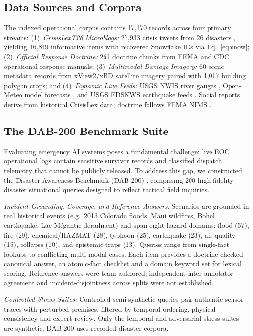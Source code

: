 \documentclass[conference]{IEEEtran}
\begin{document}
\subsection{Data Sources and Corpora}
The indexed operational corpus contains 17,170 records across four primary streams: (1)~\textit{CrisisLexT26 Microblogs:} 27,933 crisis tweets from 26 disasters \cite{olteanu2015}, yielding 16,849 informative items with recovered Snowflake IDs via Eq.~\eqref{eq:snow}; (2)~\textit{Official Response Doctrine:} 261 doctrine chunks from FEMA and CDC operational response manuals; (3)~\textit{Multimodal Damage Imagery:} 60 scene metadata records from xView2/xBD satellite imagery \cite{xview2} paired with 1,017 building polygon crops; and (4)~\textit{Dynamic Live Feeds:} USGS NWIS river gauges \cite{usgsnwis}, Open-Meteo model forecasts \cite{openmeteo}, and USGS FDSNWS earthquake feeds \cite{usgsfdsn}. Social reports derive from historical CrisisLex data; doctrine follows FEMA NIMS \cite{femanims}.

\subsection{The DAB-200 Benchmark Suite}
Evaluating emergency AI systems poses a fundamental challenge: live EOC operational logs contain sensitive survivor records and classified dispatch telemetry that cannot be publicly released. To address this gap, we constructed the Disaster Awareness Benchmark (DAB-200) \cite{dab200}, comprising 200 high-fidelity disaster situational queries designed to reflect tactical field inquiries.

\textit{Incident Grounding, Coverage, and Reference Answers:} Scenarios are grounded in real historical events (e.g.\ 2013 Colorado floods, Maui wildfires, Bohol earthquake, Lac-M\'{e}gantic derailment) \cite{olteanu2015} and span eight hazard domains: flood (57), fire (29), chemical/HAZMAT (28), typhoon (25), earthquake (23), air quality (15), collapse (10), and epistemic traps (13). Queries range from single-fact lookups to conflicting multi-modal cases. Each item provides a doctrine-checked canonical answer, an atomic-fact checklist and a domain keyword set for lexical scoring. Reference answers were team-authored; independent inter-annotator agreement and incident-disjointness across splits were not established.

\textit{Controlled Stress Suites:} Controlled semi-synthetic queries pair authentic sensor traces with perturbed premises, filtered by temporal ordering, physical consistency and expert review. Only the temporal and adversarial stress suites are synthetic; DAB-200 uses recorded disaster corpora.
\end{document}
